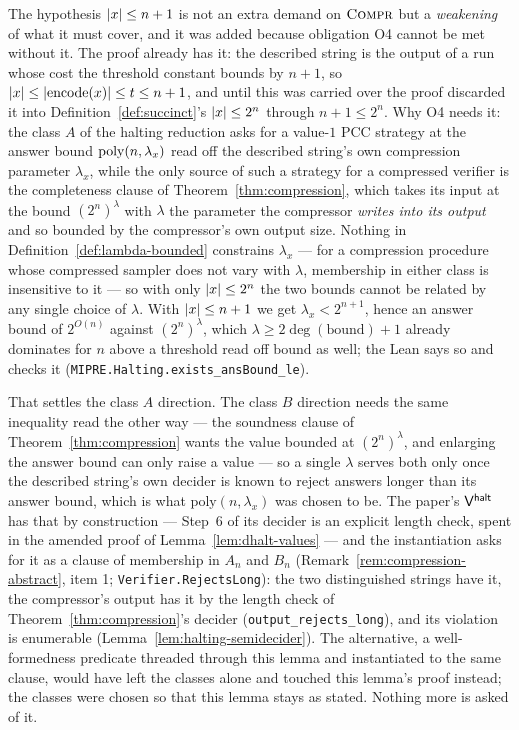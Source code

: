 The hypothesis $\left\vert {x} \right\vert \leq n + 1$ is not an extra demand on $\textsc{Compr}$ but a \emph{weakening} of
what it must cover, and it was added because obligation O4 cannot be met without it. The
proof already has it: the described string is the output of a run whose cost the threshold
constant bounds by $n + 1$, so $\left\vert {x} \right\vert \leq \left\vert {\mathrm{encode}(x)} \right\vert \leq t \leq n + 1$,
and until this was carried over the proof discarded it into
Definition~\ref{def:succinct}'s $\left\vert {x} \right\vert \leq 2^n$ through $n + 1 \leq 2^n$. Why O4 needs
it: the class $A$ of the halting reduction asks for a value-$1$ PCC strategy at the answer
bound $\mathrm{poly}(n, \lambda_x)$ read off the described string's own compression parameter
$\lambda_x$, while the only source of such a strategy for a compressed verifier is the
completeness clause of Theorem~\ref{thm:compression}, which takes its input at the bound
$(2^n)^\lambda$ with $\lambda$ the parameter the compressor \emph{writes into its output} and so
bounded by the compressor's own output size. Nothing in Definition~\ref{def:lambda-bounded}
constrains $\lambda_x$ --- for a compression procedure whose compressed sampler does not vary
with $\lambda$, membership in either class is insensitive to it --- so with only
$\left\vert {x} \right\vert \leq 2^n$ the two bounds cannot be related by any single choice of $\lambda$. With
$\left\vert {x} \right\vert \leq n + 1$ we get $\lambda_x < 2^{n+1}$, hence an answer bound of
$2^{O(n)}$ against $(2^n)^\lambda$, which $\lambda \geq 2\deg(\mathrm{bound}) + 1$ already
dominates for $n$ above a threshold read off $\mathrm{bound}$ as well; the Lean says so and
checks it (\texttt{MIPRE.Halting.exists\_ansBound\_le}).

That settles the class $A$ direction. The class $B$ direction needs the same inequality read
the other way --- the soundness clause of Theorem~\ref{thm:compression} wants the value
bounded at $(2^n)^\lambda$, and enlarging the answer bound can only raise a value --- so a
single $\lambda$ serves both only once the described string's own decider is known to reject
answers longer than its answer bound, which is what $\mathrm{poly}(n, \lambda_x)$ was chosen
to be. The paper's $\mathsf{V}^{\mathsf{halt}}$ has that by construction --- Step~6 of its decider is an explicit
length check, spent in the amended proof of Lemma~\ref{lem:dhalt-values} --- and the
instantiation asks for it as a clause of membership in $A_n$ and $B_n$
(Remark~\ref{rem:compression-abstract}, item 1; \texttt{Verifier.RejectsLong}): the two
distinguished strings have it, the compressor's output has it by the length check of
Theorem~\ref{thm:compression}'s decider (\texttt{output\_rejects\_long}), and its violation is
enumerable (Lemma~\ref{lem:halting-semidecider}). The alternative, a well-formedness predicate
threaded through this lemma and instantiated to the same clause, would have left the classes
alone and touched this lemma's proof instead; the classes were chosen so that this lemma stays
as stated. Nothing more is asked of it.

